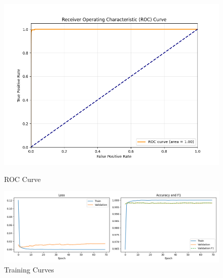 \begin{figure}[httpb] %
    \centering
    \begin{minipage}{0.45\textwidth}
        \centering
        \includegraphics[width=\textwidth]{../images/ner_roc_curve.png} %
        \caption{ROC Curve}
        \label{fig:ner_roc_curve}
    \end{minipage}
    \hfill
    \begin{minipage}{0.45\textwidth}
        \centering
        \includegraphics[width=\textwidth]{../images/ner_training_curves.png} %
        \caption{Training Curves}
        \label{fig:ner_training_curves}
    \end{minipage}
\end{figure}

